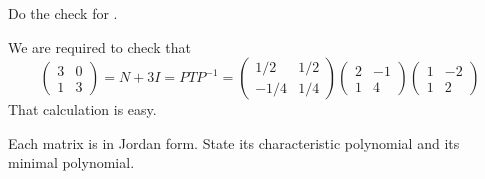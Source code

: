 \begin{exercises}
  \item 
    Do the check for .
    \begin{answer}
      We are required to check that
      \begin{equation*}
         \begin{pmatrix}
           3  &0  \\
           1  &3
         \end{pmatrix}
         =
         N+3I=PTP^{-1}
         =
         \begin{pmatrix}
           1/2  &1/2  \\
          -1/4 &1/4
         \end{pmatrix}
         \begin{pmatrix}
           2  &-1  \\
           1  &4
         \end{pmatrix}
         \begin{pmatrix}
           1  &-2  \\
           1  &2
         \end{pmatrix}
      \end{equation*}
      That calculation is easy.
    \end{answer}
  \item 
    Each matrix is in Jordan form.
    State its characteristic polynomial and its minimal polynomial.
\end{exercises}

